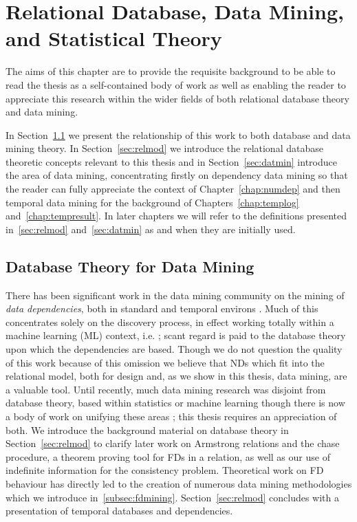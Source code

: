 \chapter{Relational Database, Data Mining, and Statistical
Theory}\label{chap:review}

The aims of this chapter are to provide the requisite
background to be able to read the thesis as a self-contained body of
work as well as enabling the reader to appreciate this research within
the wider fields of both relational database theory and data mining.

In Section~\ref{sec:db_for_dm} we present the relationship of this
work to both database and data mining theory. 
In Section~\ref{sec:relmod} we introduce the relational database theoretic
concepts relevant to this thesis and in Section~\ref{sec:datmin}
introduce the area of data mining, concentrating firstly on dependency data
mining so that the reader can fully appreciate the context of
Chapter~\ref{chap:numdep} and then temporal data mining for the
background of Chapters~\ref{chap:templog}
and~\ref{chap:tempresult}. In later chapters we will refer to 
the definitions presented in~\ref{sec:relmod} and~\ref{sec:datmin}
as and when they are initially used.

\section{Database Theory for Data Mining}\label{sec:db_for_dm}
There has been significant work in the data mining community on the
mining of {\em data dependencies}, both in standard \cite{psm93,km95} and
temporal environs \cite{bwj96}. Much of this concentrates solely
on the discovery process, in effect working totally within a machine
learning (ML) context, i.e. \cite{she91}; scant regard is paid to the
database theory upon which the dependencies are based. Though we
do not question the quality of this work because of this omission we
believe that NDs which fit into the
relational model, both for design and, as we show in this thesis, data
mining, are a valuable tool. Until recently, much data mining research
was disjoint from database 
theory, based within statistics or machine learning though there is
now a body of work on unifying these areas \cite{cha98}; this thesis
requires an appreciation of both.
We introduce the background material on
database theory in Section~\ref{sec:relmod} to clarify
later work on Armstrong relations and the chase procedure, a
theorem proving tool for FDs in a relation, as well as our use of indefinite
information for the consistency problem. Theoretical work on FD
behaviour has directly led to the 
creation of numerous data mining methodologies which we introduce
in~\ref{subsec:fdmining}.  Section~\ref{sec:relmod} concludes with a
presentation of 
temporal databases and dependencies.

